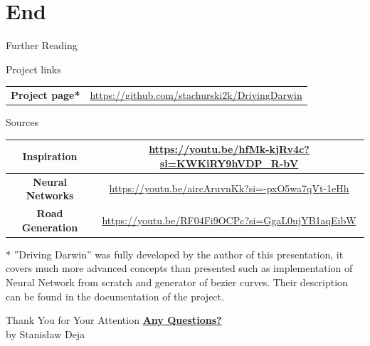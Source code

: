 \documentclass{do}
\begin{document}
\section{End}
\begin{frame}{Further Reading}
    \begin{block}{Project links}
        \begin{tabular}{c|c}
           \textbf{\footnotesize{Project page* }}&\footnotesize{ \url{https://github.com/stachurski2k/DrivingDarwin}}
        \end{tabular}
    \end{block}
    \begin{block}{Sources}
        \begin{tabular}{c|c}
\textbf{\scriptsize{Inspiration}} & \scriptsize{ \url{https://youtu.be/hfMk-kjRv4c?si=KWKiRY9hVDP_R-bV}}\\
\hline
\textbf{\scriptsize{Neural Networks}} & \scriptsize{ \url{https://youtu.be/aircAruvnKk?si=-pxO5wa7qVt-1eHh}}\\
\hline
\textbf{\scriptsize{Road Generation}}& \scriptsize{ \url{https://youtu.be/RF04Fi9OCPc?si=GgaL0ujYB1aqEibW}}\\
        \end{tabular}
    \end{block}
    \footnotesize{
    * ”Driving Darwin” was fully developed by the author of this presentation, it covers
    much more advanced concepts than presented such as implementation of Neural
    Network from scratch and generator of bezier curves. Their description can be found
    in the documentation of the project.}
\end{frame}

\begin{frame}{Thank You for Your Attention}
    \centering
    \textbf{\underline{\Huge{Any Questions?}}}\\
    by Stanisław Deja
\end{frame}
\end{document}
